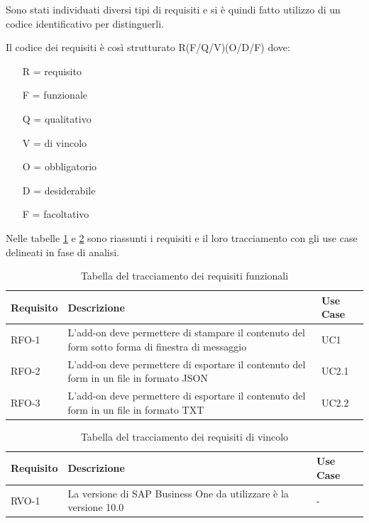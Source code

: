 Sono stati individuati diversi tipi di requisiti e si è quindi fatto utilizzo di un codice identificativo per distinguerli.

Il codice dei requisiti è così strutturato R(F/Q/V)(O/D/F) dove:
\begin{enumerate}
	\item[R =] requisito
	\item[F =] funzionale
	\item[Q =] qualitativo
	\item[V =] di vincolo
	\item[O =] obbligatorio
	\item[D =] desiderabile
	\item[F =] facoltativo
\end{enumerate}
Nelle tabelle \ref{tab:requisiti-funzionali} e \ref{tab:requisiti-vincolo} sono riassunti i requisiti e il loro tracciamento con gli use case delineati in fase di analisi.


\begin{table}[!h]%
	\begin{tabularx}{\textwidth}{lXl}
		\hline\hline
		\textbf{Requisito} & \textbf{Descrizione} & \textbf{Use Case}\\
		\hline
		RFO-1     & L'add-on deve permettere di stampare il contenuto del form sotto forma di finestra di messaggio & UC1 \\
		RFO-2     & L'add-on deve permettere di esportare il contenuto del form in un file in formato JSON & UC2.1\\
		RFO-3     & L'add-on deve permettere di esportare il contenuto del form in un file in formato TXT & UC2.2\\
		\hline
	\end{tabularx}
	\caption{Tabella del tracciamento dei requisiti funzionali}
	\label{tab:requisiti-funzionali}
\end{table}%

\begin{table}[!h]%
	\begin{tabularx}{\textwidth}{lXl}
		\hline\hline
		\textbf{Requisito} & \textbf{Descrizione} & \textbf{Use Case}\\
		\hline
		RVO-1    & La versione di SAP Business One da utilizzare è la versione 10.0 & - \\
		\hline
	\end{tabularx}
	\caption{Tabella del tracciamento dei requisiti di vincolo}
	\label{tab:requisiti-vincolo}
\end{table}%

